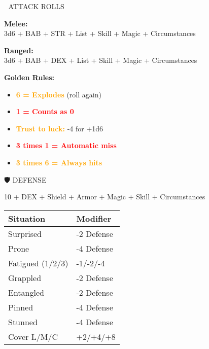 \documentclass[10pt,a4paper,landscape]{article}
\newcommand{\highlight}[1]{\textcolor{orange}{\textbf{#1}}}
\newcommand{\critical}[1]{\textcolor{red}{\textbf{#1}}}
\begin{document}
\begin{multicols}{4}
		\begin{mainsection}{🎯 ATTACK ROLLS}
			\begin{formula}
				\textbf{Melee:}\\
				3d6 + BAB + STR + List + Skill + Magic + Circumstances
			\end{formula}
			
			\begin{formula}
				\textbf{Ranged:}\\
				3d6 + BAB + DEX + List + Skill + Magic + Circumstances
			\end{formula}
			
			\textbf{Golden Rules:}
			\begin{itemize}[noitemsep,leftmargin=8pt]
				\item \highlight{6 = Explodes} (roll again)
				\item \critical{1 = Counts as 0}
				\item \highlight{Trust to luck:} -4 for +1d6
				\item \critical{3 times 1 = Automatic miss}
				\item \highlight{3 times 6 = Always hits}
			\end{itemize}
		\end{mainsection}
		
		\begin{mainsection}{🛡️ DEFENSE}
			\begin{formula}
				10 + DEX + Shield + Armor + Magic + Skill + Circumstances
			\end{formula}
			
			\begin{tabular}{@{}ll@{}}
				\toprule
				\textbf{Situation} & \textbf{Modifier} \\
				\midrule
				Surprised & -2 Defense \\
				Prone & -4 Defense \\
				Fatigued (1/2/3) & -1/-2/-4 \\
				Grappled & -2 Defense \\
				Entangled & -2 Defense \\
				Pinned & -4 Defense \\
				Stunned & -4 Defense \\
				Cover L/M/C & +2/+4/+8 \\
				\bottomrule
			\end{tabular}
		\end{mainsection}
		
		\columnbreak
		

\end{multicols}
\end{document}
